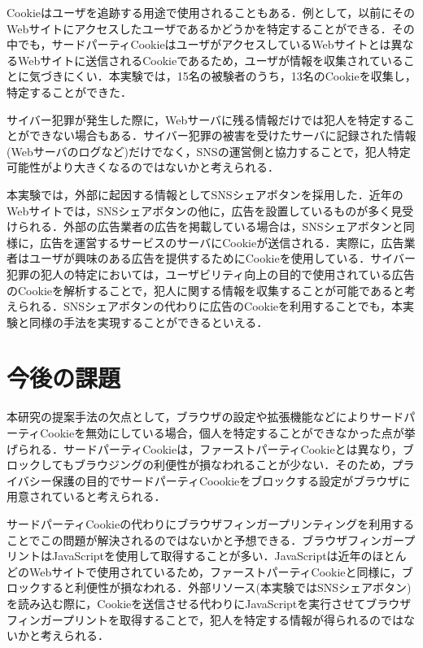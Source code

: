 \documentclass[10pt, a4paper]{jreport}
\begin{document}
Cookieはユーザを追跡する用途で使用されることもある．例として，以前にそのWebサイトにアクセスしたユーザであるかどうかを特定することができる．その中でも，サードパーティCookieはユーザがアクセスしているWebサイトとは異なるWebサイトに送信されるCookieであるため，ユーザが情報を収集されていることに気づきにくい．本実験では，15名の被験者のうち，13名のCookieを収集し，特定することができた．

サイバー犯罪が発生した際に，Webサーバに残る情報だけでは犯人を特定することができない場合もある．サイバー犯罪の被害を受けたサーバに記録された情報(Webサーバのログなど)だけでなく，SNSの運営側と協力することで，犯人特定可能性がより大きくなるのではないかと考えられる．

本実験では，外部に起因する情報としてSNSシェアボタンを採用した．近年のWebサイトでは，SNSシェアボタンの他に，広告を設置しているものが多く見受けられる．外部の広告業者の広告を掲載している場合は，SNSシェアボタンと同様に，広告を運営するサービスのサーバにCookieが送信される．実際に，広告業者はユーザが興味のある広告を提供するためにCookieを使用している\cite{third_party_cookie_is_danger}．サイバー犯罪の犯人の特定においては，ユーザビリティ向上の目的で使用されている広告のCookieを解析することで，犯人に関する情報を収集することが可能であると考えられる．SNSシェアボタンの代わりに広告のCookieを利用することでも，本実験と同様の手法を実現することができるといえる．

\section{今後の課題}
本研究の提案手法の欠点として，ブラウザの設定や拡張機能などによりサードパーティCookieを無効にしている場合，個人を特定することができなかった点が挙げられる．サードパーティCookieは，ファーストパーティCookieとは異なり，ブロックしてもブラウジングの利便性が損なわれることが少ない．そのため，プライバシー保護の目的でサードパーティCoookieをブロックする設定がブラウザに用意されていると考えられる．

サードパーティCookieの代わりにブラウザフィンガープリンティングを利用することでこの問題が解決されるのではないかと予想できる．ブラウザフィンガープリントはJavaScriptを使用して取得することが多い．JavaScriptは近年のほとんどのWebサイトで使用されているため，ファーストパーティCookieと同様に，ブロックすると利便性が損なわれる．外部リソース(本実験ではSNSシェアボタン)を読み込む際に，Cookieを送信させる代わりにJavaScriptを実行させてブラウザフィンガープリントを取得することで，犯人を特定する情報が得られるのではないかと考えられる．
\end{document}
